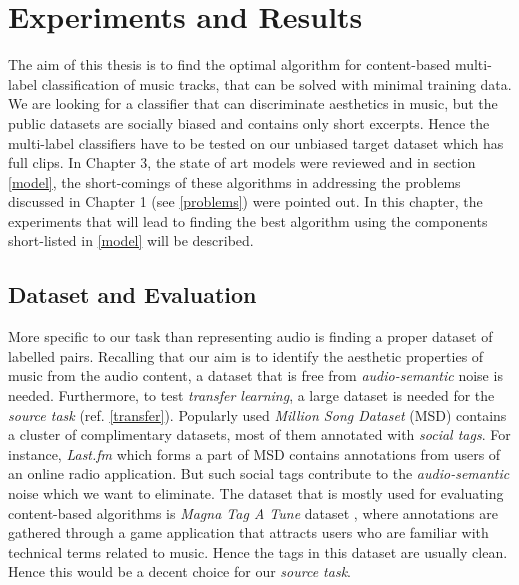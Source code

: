 
\chapter{Experiments and Results} %

\label{Chapter4} %

The aim of this thesis is to find the optimal algorithm for content-based multi-label classification of music tracks, that can be solved with minimal training data. We are looking for a classifier that can discriminate aesthetics in music, but the public datasets are socially biased and contains only short excerpts. Hence the multi-label classifiers have to be tested on our unbiased target dataset which has full clips. In Chapter 3, the state of art models were reviewed and in section \ref{model}, the short-comings of these algorithms in addressing the problems discussed in Chapter 1 (see \ref{problems}) were pointed out. In this chapter, the experiments that will lead to finding the best algorithm using the components short-listed in \ref{model} will be described.

\section{Dataset and Evaluation}
\label{dataset}
More specific to our task than representing audio is finding a proper dataset of labelled pairs. Recalling that our aim is to identify the aesthetic properties of music from the audio content, a dataset that is free from \textit{audio-semantic} noise is needed. Furthermore, to test \textit{transfer learning}, a large dataset is needed for the \textit{source task} (ref. \ref{transfer}). Popularly used \textit{Million Song Dataset} (MSD) \cite{MSD} contains a cluster of complimentary datasets, most of them annotated with \textit{social tags}. For instance, \textit{Last.fm} which forms a part of MSD contains annotations from users of an online radio application. But such social tags contribute to the \textit{audio-semantic} noise which we want to eliminate. The dataset that is mostly used for evaluating content-based algorithms is \textit{Magna Tag A Tune} dataset \cite{MTT}, where annotations are gathered through a game application that attracts users who are familiar with technical terms related to music. Hence the tags in this dataset are usually clean. Hence this would be a decent choice for our \textit{source task}.

